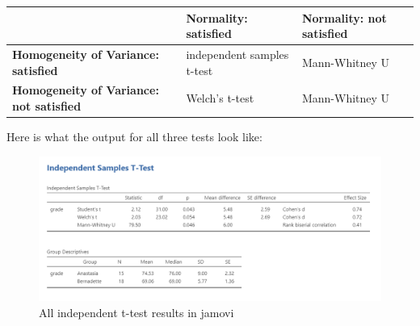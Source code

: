 \documentclass[
]{book}
\begin{document}
\begin{longtable}[]{@{}lll@{}}
\toprule
\begin{minipage}[b]{0.39\columnwidth}\raggedright
\strut
\end{minipage} & \begin{minipage}[b]{0.25\columnwidth}\raggedright
\textbf{Normality: satisfied}\strut
\end{minipage} & \begin{minipage}[b]{0.27\columnwidth}\raggedright
\textbf{Normality: not satisfied}\strut
\end{minipage}\tabularnewline
\midrule
\endhead
\begin{minipage}[t]{0.39\columnwidth}\raggedright
\textbf{Homogeneity of Variance: satisfied}\strut
\end{minipage} & \begin{minipage}[t]{0.25\columnwidth}\raggedright
independent samples t-test\strut
\end{minipage} & \begin{minipage}[t]{0.27\columnwidth}\raggedright
Mann-Whitney U\strut
\end{minipage}\tabularnewline
\begin{minipage}[t]{0.39\columnwidth}\raggedright
\textbf{Homogeneity of Variance: not satisfied}\strut
\end{minipage} & \begin{minipage}[t]{0.25\columnwidth}\raggedright
Welch's t-test\strut
\end{minipage} & \begin{minipage}[t]{0.27\columnwidth}\raggedright
Mann-Whitney U\strut
\end{minipage}\tabularnewline
\bottomrule
\end{longtable}

Here is what the output for all three tests look like:

\begin{figure}

{\centering \includegraphics[width=1\linewidth]{images/02-independent_t-test/independent_t-test_full-results} 

}

\caption{All independent t-test results in jamovi}\label{fig:unnamed-chunk-6}
\end{figure}
\end{document}
